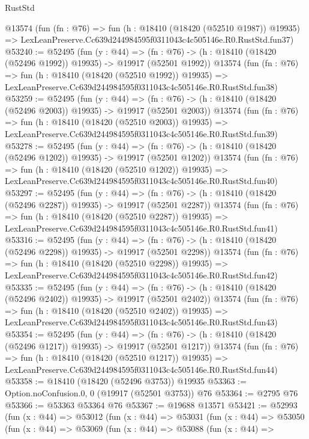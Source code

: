 \begin{lexlean}{RustStd}
\begin{coremodule}
    @13574
    (fun (fn : @76) =>
    fun (h : @18410 (@18420 (@52510 @1987)) @19935) =>
    LexLeanPreserve.Cc639d244984595f0311043c4c505146e.R0.RustStd.fun37)
@53240 := @52495
    (fun (y : @44) =>
    (fn : @76) -> (h : @18410 (@18420 (@52496 @1992)) @19935) -> @19917 (@52501 @1992))
    @13574
    (fun (fn : @76) =>
    fun (h : @18410 (@18420 (@52510 @1992)) @19935) =>
    LexLeanPreserve.Cc639d244984595f0311043c4c505146e.R0.RustStd.fun38)
@53259 := @52495
    (fun (y : @44) =>
    (fn : @76) -> (h : @18410 (@18420 (@52496 @2003)) @19935) -> @19917 (@52501 @2003))
    @13574
    (fun (fn : @76) =>
    fun (h : @18410 (@18420 (@52510 @2003)) @19935) =>
    LexLeanPreserve.Cc639d244984595f0311043c4c505146e.R0.RustStd.fun39)
@53278 := @52495
    (fun (y : @44) =>
    (fn : @76) -> (h : @18410 (@18420 (@52496 @1202)) @19935) -> @19917 (@52501 @1202))
    @13574
    (fun (fn : @76) =>
    fun (h : @18410 (@18420 (@52510 @1202)) @19935) =>
    LexLeanPreserve.Cc639d244984595f0311043c4c505146e.R0.RustStd.fun40)
@53297 := @52495
    (fun (y : @44) =>
    (fn : @76) -> (h : @18410 (@18420 (@52496 @2287)) @19935) -> @19917 (@52501 @2287))
    @13574
    (fun (fn : @76) =>
    fun (h : @18410 (@18420 (@52510 @2287)) @19935) =>
    LexLeanPreserve.Cc639d244984595f0311043c4c505146e.R0.RustStd.fun41)
@53316 := @52495
    (fun (y : @44) =>
    (fn : @76) -> (h : @18410 (@18420 (@52496 @2298)) @19935) -> @19917 (@52501 @2298))
    @13574
    (fun (fn : @76) =>
    fun (h : @18410 (@18420 (@52510 @2298)) @19935) =>
    LexLeanPreserve.Cc639d244984595f0311043c4c505146e.R0.RustStd.fun42)
@53335 := @52495
    (fun (y : @44) =>
    (fn : @76) -> (h : @18410 (@18420 (@52496 @2402)) @19935) -> @19917 (@52501 @2402))
    @13574
    (fun (fn : @76) =>
    fun (h : @18410 (@18420 (@52510 @2402)) @19935) =>
    LexLeanPreserve.Cc639d244984595f0311043c4c505146e.R0.RustStd.fun43)
@53354 := @52495
    (fun (y : @44) =>
    (fn : @76) -> (h : @18410 (@18420 (@52496 @1217)) @19935) -> @19917 (@52501 @1217))
    @13574
    (fun (fn : @76) =>
    fun (h : @18410 (@18420 (@52510 @1217)) @19935) =>
    LexLeanPreserve.Cc639d244984595f0311043c4c505146e.R0.RustStd.fun44)
@53358 := @18410 (@18420 (@52496 @3753)) @19935
@53363 := Option.noConfusion.{0, 0} (@19917 (@52501 @3753)) @76
@53364 := @2795 @76
@53366 := @53363 @53364 @76
@53367 := @19688 @13571
@53421 := @52993
    (fun (x : @44) =>
    @53012
      (fun (x : @44) =>
      @53031
        (fun (x : @44) =>
        @53050
          (fun (x : @44) =>
          @53069
            (fun (x : @44) =>
            @53088
              (fun (x : @44) =>

\end{coremodule}
\end{lexlean}
